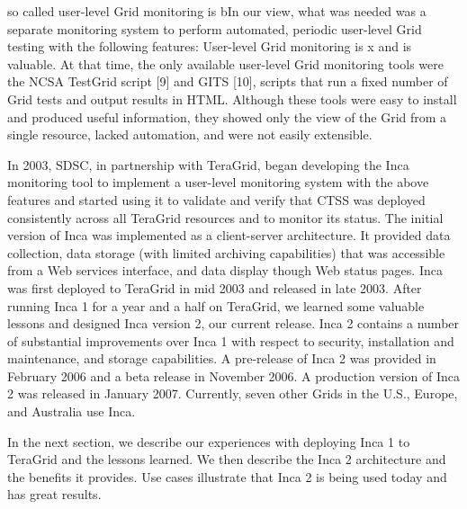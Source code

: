 \documentclass[times, 10pt,twocolumn]{article}
\begin{document}
so called user-level Grid monitoring is bIn our view, what was
needed was a separate
monitoring system to perform automated, periodic user-level Grid testing with
the following features:
User-level Grid monitoring is x and is valuable.  
At that
time, the only available user-level Grid monitoring tools were the NCSA
TestGrid script [9] and GITS [10], scripts that run a fixed number of Grid
tests and output results in HTML.  Although these tools were easy to install
and produced useful information, they showed only the view of the Grid from a
single resource, lacked automation, and were not easily extensible.  

In 2003, SDSC, in partnership with TeraGrid, began developing the Inca
monitoring tool to implement a user-level monitoring system with the above
features and started using it to validate and verify that CTSS was deployed
consistently across all TeraGrid resources and to monitor its status.  
The initial version of Inca was implemented as a client-server architecture.
It provided data collection, data storage (with limited archiving
capabilities) that was accessible from a Web services interface, and data
display though Web status pages.  Inca was first deployed to TeraGrid in mid
2003 and released in late 2003. After running Inca 1 for a year and a half on
TeraGrid, we learned some valuable lessons and designed Inca version 2, our
current release.  Inca 2 contains a number of substantial improvements over
Inca 1 with respect to security, installation and maintenance, and storage
capabilities.  A pre-release of Inca 2 was provided in February 2006 and a
beta release in November 2006.  A production version of Inca 2 was released in
January 2007.  Currently, seven other Grids in the U.S., Europe, and Australia
use Inca.  

In the next section, we describe our experiences with deploying Inca 1 to
TeraGrid and the lessons learned.  We then describe the Inca 2 architecture
and the benefits it provides.  Use cases illustrate that Inca 2 is being used
today and has great results.

  
\end{document}
